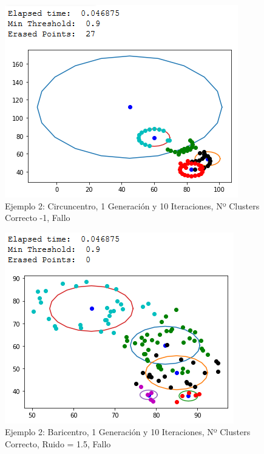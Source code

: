 \documentclass[conference,a4paper]{IEEEtran}
\begin{document}
\begin{figure}[H]
\centering
\includegraphics[scale=0.65]{Experimentacion/Ejemplo2/ej2_c_1_10_lc_wrong}
\caption{Ejemplo 2: Circuncentro, 1 Generación y 10 Iteraciones,  Nº Clusters Correcto -1, Fallo\\}
\end{figure}

\begin{figure}[H]
\centering
\includegraphics[scale=0.65]{Experimentacion/Ejemplo2/ej2_b_1_10_mr_wrong}
\caption{Ejemplo 2: Baricentro, 1 Generación y 10 Iteraciones,  Nº Clusters Correcto, Ruido = 1.5, Fallo\\}
\end{figure}
\end{document}
